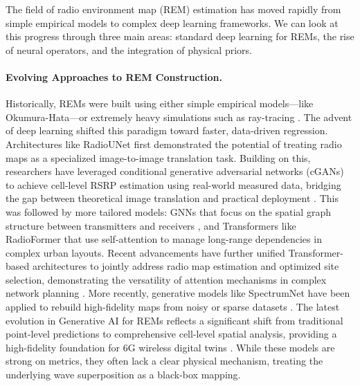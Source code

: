 \documentclass{article}
\begin{document}
The field of radio environment map (REM) estimation has moved rapidly from simple empirical models to complex deep learning frameworks. We can look at this progress through three main areas: standard deep learning for REMs, the rise of neural operators, and the integration of physical priors.

\paragraph{Evolving Approaches to REM Construction.}
Historically, REMs were built using either simple empirical models—like Okumura-Hata—or extremely heavy simulations such as ray-tracing \cite{oliner2011modern}. The advent of deep learning shifted this paradigm toward faster, data-driven regression. Architectures like RadioUNet \cite{levie2021radiounet} first demonstrated the potential of treating radio maps as a specialized image-to-image translation task. 
Building on this, researchers have leveraged conditional generative adversarial networks (cGANs) to achieve cell-level RSRP estimation using real-world measured data, bridging the gap between theoretical image translation and practical deployment \cite{Zheng2023RSRP}. 
This was followed by more tailored models: GNNs that focus on the spatial graph structure between transmitters and receivers \cite{chen2023gnnrem}, and Transformers like RadioFormer \cite{fang2025radioformer} that use self-attention to manage long-range dependencies in complex urban layouts. 
Recent advancements have further unified Transformer-based architectures to jointly address radio map estimation and optimized site selection, demonstrating the versatility of attention mechanisms in complex network planning \cite{Zheng2024Transformer}.
More recently, generative models like SpectrumNet have been applied to rebuild high-fidelity maps from noisy or sparse datasets \cite{zhang2024spectrumnet,jia2025rmdm}. 
The latest evolution in Generative AI for REMs reflects a significant shift from traditional point-level predictions to comprehensive cell-level spatial analysis, providing a high-fidelity foundation for 6G wireless digital twins \cite{Zheng2025GenAI}. 
While these models are strong on metrics, they often lack a clear physical mechanism, treating the underlying wave superposition as a black-box mapping.
\end{document}
